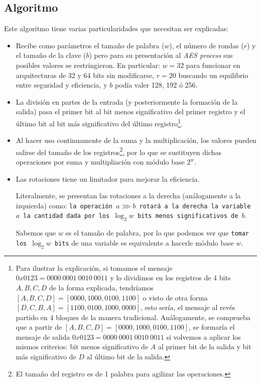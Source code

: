 \subsection{Algoritmo}
Este algoritmo tiene varias particularidades que necesitan ser explicadas: \cite{RC6_AES}
\begin{itemize}
	\item Recibe como parámetros el tamaño de palabra ($w$), el número de rondas ($r$) y el tamaño de la clave ($b$) pero para su presentación al \textit{AES process} sus posibles valores se restringieron. En particular: $w = 32$ para funcionar en arquitecturas de 32 y 64 bits sin modificarse, $r = 20$ buscando un equilibrio entre seguridad y eficiencia, y $b$ podía valer 128, 192 ó 256.
	
	\item La división en partes de la entrada (y posteriormente la formación de la salida) pasa el primer bit al bit menos significativo del primer registro y el último bit al bit más significativo del último registro\footnote{Para ilustrar la explicación, si tomamos el mensaje $0x0123 = 0000\ 0001\ 0010\ 0011$ y lo dividimos en los registros de 4 bits $A, B, C, D$ de la forma explicada, tendríamos $[A,B,C,D] = [0000, 1000, 0100, 1100]$ o visto de otra forma $[D, C, B, A] = [1100, 0100, 1000, 0000]$, esto sería, el mensaje al revés partido en 4 bloques de la manera tradicional. Análogamente, se comprueba que a partir de $[A,B,C,D] = [0000, 1000, 0100, 1100]$, se formaría el mensaje de salida $0x0123 = 0000\ 0001\ 0010\ 0011$ si volvemos a aplicar los mismos criterios: bit menos significativo de $A$ al primer bit de la salida y bit más significativo de $D$ al último bit de la salida.}.

	\item Al hacer uso continuamente de la suma y la multiplicación, los valores pueden salirse del tamaño de los registros\footnote{El tamaño del registro es de 1 palabra para agilizar las operaciones.}, por lo que se sustituyen dichas operaciones por suma y multipliación con módulo base $2^{w}$.

	\item Las rotaciones tiene un limitador para mejorar la eficiencia.
	
	Literalmente, se presentan las rotaciones a la derecha (análogamente a la izquierda) como: \texttt{la operación $a \ggg b$ rotará a la derecha la variable $a$ la cantidad dada por los $\log_2 w$ bits menos significativos de $b$}.
	
	Sabemos que $w$ es el tamaño de palabra, por lo que podemos ver que \texttt{tomar los $\log_2 w$ bits} de una variable es equivalente a hacerle módulo base $w$.
	

\end{itemize}
